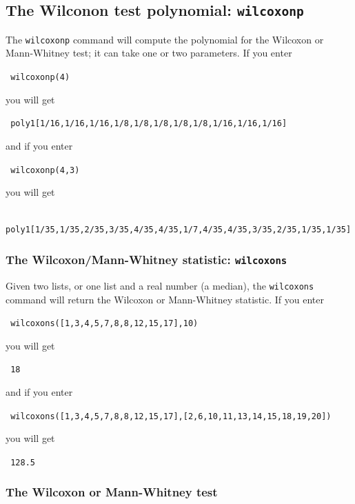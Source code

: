 \documentclass[a4paper,11pt]{book}
\begin{document}
\subsection{The Wilconon test polynomial: \texttt{wilcoxonp}}

The \texttt{wilcoxonp} command will compute the polynomial for the
Wilcoxon or Mann-Whitney test; it can take one or two parameters.  If
you enter
\begin{center}
  \tt
  wilcoxonp(4)
\end{center}
you will get
\begin{center}
  \tt
  poly1[1/16,1/16,1/16,1/8,1/8,1/8,1/8,1/8,1/16,1/16,1/16]
\end{center}
and if you enter
\begin{center}
  \tt
  wilcoxonp(4,3)
\end{center}
you will get
\begin{center}
  \tt
  poly1[1/35,1/35,2/35,3/35,4/35,4/35,1/7,4/35,4/35,3/35,2/35,1/35,1/35]
\end{center}

\subsubsection{The Wilcoxon/Mann-Whitney statistic: \texttt{wilcoxons}}

Given two lists, or one list and a real number (a median), the
\texttt{wilcoxons} command will return the Wilcoxon or Mann-Whitney statistic. 
If you enter
\begin{center}
  \tt
  wilcoxons([1,3,4,5,7,8,8,12,15,17],10)
\end{center}
you will get
\begin{center}
  \tt
  18
\end{center}
and if you enter
\begin{center}
  \tt
  wilcoxons([1,3,4,5,7,8,8,12,15,17],[2,6,10,11,13,14,15,18,19,20])
\end{center}
you will get
\begin{center}
  \tt
  128.5
\end{center}

\subsubsection{The Wilcoxon or Mann-Whitney test}
\end{document}
